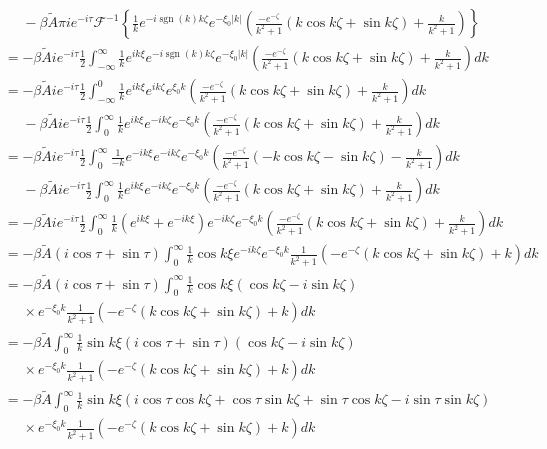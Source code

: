 \documentclass[12pt]{article}
\DeclareMathOperator{\sgn}{sgn}
\begin{document}
\begin{align}
& \phantom{=} -\beta \tilde{A} \pi i e^{-i\tau} \mathcal{F}^{-1} \left\{ \frac{1}{k} e^{-i\sgn(k) k \zeta} e^{-\xi_0 |k|}   \left( \frac{-e^{-\zeta}}{k^2+1}\left(k\cos k\zeta + \sin k\zeta \right) + \frac{k}{k^2+1} \right) \right\} \\
&=-\beta \tilde{A} i e^{-i\tau} \frac{1}{2} \int_{-\infty}^\infty \frac{1}{k} e^{i k \xi} e^{-i\sgn(k) k \zeta} e^{-\xi_0 |k|}   \left( \frac{-e^{-\zeta}}{k^2+1}\left(k\cos k\zeta + \sin k\zeta \right) + \frac{k}{k^2+1} \right) dk \\
&=-\beta \tilde{A} i e^{-i\tau} \frac{1}{2} \int_{-\infty}^0 \frac{1}{k} e^{i k \xi} e^{i k \zeta} e^{\xi_0 k}   \left( \frac{-e^{-\zeta}}{k^2+1}\left(k\cos k\zeta + \sin k\zeta \right) + \frac{k}{k^2+1} \right) dk \\
&\phantom{=}  -\beta \tilde{A} i e^{-i\tau} \frac{1}{2} \int_0^\infty \frac{1}{k} e^{i k \xi} e^{-i k \zeta} e^{-\xi_0 k}   \left( \frac{-e^{-\zeta}}{k^2+1}\left(k\cos k\zeta + \sin k\zeta \right) + \frac{k}{k^2+1} \right) dk \\
&=-\beta \tilde{A} i e^{-i\tau} \frac{1}{2} \int_{0}^\infty \frac{1}{-k} e^{-ik \xi} e^{-ik \zeta} e^{-\xi_0k}   \left( \frac{-e^{-\zeta}}{k^2+1}\left(-k\cos k\zeta - \sin k\zeta \right) - \frac{k}{k^2+1} \right) dk \\
&\phantom{=}  -\beta \tilde{A} i e^{-i\tau} \frac{1}{2} \int_0^\infty \frac{1}{k} e^{i k \xi} e^{-i k \zeta} e^{-\xi_0 k}   \left( \frac{-e^{-\zeta}}{k^2+1}\left(k\cos k\zeta + \sin k\zeta \right) + \frac{k}{k^2+1} \right) dk \\
&= -\beta \tilde{A} i e^{-i\tau} \frac{1}{2} \int_0^\infty \frac{1}{k} \left(e^{i k \xi} + e^{-ik\xi} \right) e^{-i k \zeta} e^{-\xi_0 k}   \left( \frac{-e^{-\zeta}}{k^2+1}\left(k\cos k\zeta + \sin k\zeta \right) + \frac{k}{k^2+1} \right) dk  \\
&= -\beta \tilde{A} \left(i\cos\tau+\sin\tau\right) \int_0^\infty \frac{1}{k} \cos k\xi e^{-i k \zeta} e^{-\xi_0 k}   \frac{1}{k^2+1}\left(-e^{-\zeta}\left(k\cos k\zeta + \sin k\zeta \right) + k \right) dk \\
&= -\beta \tilde{A} \left(i\cos\tau+\sin\tau\right) \int_0^\infty \frac{1}{k} \cos k\xi \left(\cos k\zeta - i\sin k\zeta \right) \\
&\phantom{=} \times e^{-\xi_0 k} \frac{1}{k^2+1}\left(-e^{-\zeta}\left(k\cos k\zeta + \sin k\zeta \right) + k \right) dk \\
&= -\beta \tilde{A} \int_0^\infty \frac{1}{k} \sin k\xi \left(i\cos\tau+\sin\tau\right)\left(\cos k\zeta - i\sin k\zeta \right) \\
&\phantom{=} \times e^{-\xi_0 k}   \frac{1}{k^2+1}\left(-e^{-\zeta}\left(k\cos k\zeta + \sin k\zeta \right) + k \right) dk \\
&= -\beta \tilde{A} \int_0^\infty \frac{1}{k} \sin k\xi \left(i\cos\tau\cos k\zeta +  \cos\tau\sin k\zeta + \sin\tau\cos k\zeta - i\sin\tau\sin k \zeta\right) \\
&\phantom{=} \times e^{-\xi_0 k}   \frac{1}{k^2+1}\left(-e^{-\zeta}\left(k\cos k\zeta + \sin k\zeta \right) + k \right) dk
\end{align}
\end{document}
